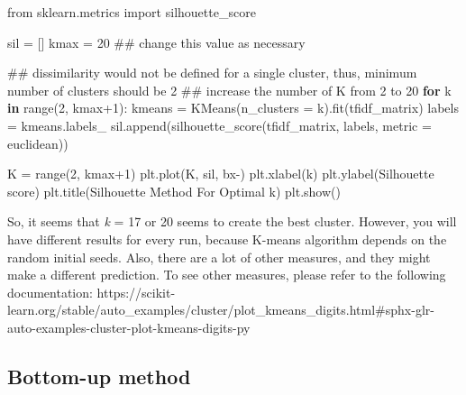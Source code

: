 \documentclass[
  letterpaper,
]{scrbook}
\newenvironment{Shaded}{\begin{snugshade}}{\end{snugshade}}
\newcommand{\BuiltInTok}[1]{\textcolor[rgb]{0.00,0.23,0.31}{#1}}
\newcommand{\CommentTok}[1]{\textcolor[rgb]{0.37,0.37,0.37}{#1}}
\newcommand{\ControlFlowTok}[1]{\textcolor[rgb]{0.00,0.23,0.31}{\textbf{#1}}}
\newcommand{\DecValTok}[1]{\textcolor[rgb]{0.68,0.00,0.00}{#1}}
\newcommand{\ImportTok}[1]{\textcolor[rgb]{0.00,0.46,0.62}{#1}}
\newcommand{\KeywordTok}[1]{\textcolor[rgb]{0.00,0.23,0.31}{\textbf{#1}}}
\newcommand{\NormalTok}[1]{\textcolor[rgb]{0.00,0.23,0.31}{#1}}
\newcommand{\OperatorTok}[1]{\textcolor[rgb]{0.37,0.37,0.37}{#1}}
\newcommand{\StringTok}[1]{\textcolor[rgb]{0.13,0.47,0.30}{#1}}
\begin{document}
\begin{Shaded}
\begin{Highlighting}[]
\ImportTok{from}\NormalTok{ sklearn.metrics }\ImportTok{import}\NormalTok{ silhouette\_score}

\NormalTok{sil }\OperatorTok{=}\NormalTok{ []}
\NormalTok{kmax }\OperatorTok{=} \DecValTok{20} \CommentTok{\#\# change this value as necessary}

\CommentTok{\#\# dissimilarity would not be defined for a single cluster, thus, minimum number of clusters should be 2}
\CommentTok{\#\# increase the number of K from 2 to 20}
\ControlFlowTok{for}\NormalTok{ k }\KeywordTok{in} \BuiltInTok{range}\NormalTok{(}\DecValTok{2}\NormalTok{, kmax}\OperatorTok{+}\DecValTok{1}\NormalTok{):}
\NormalTok{  kmeans }\OperatorTok{=}\NormalTok{ KMeans(n\_clusters }\OperatorTok{=}\NormalTok{ k).fit(tfidf\_matrix)}
\NormalTok{  labels }\OperatorTok{=}\NormalTok{ kmeans.labels\_}
\NormalTok{  sil.append(silhouette\_score(tfidf\_matrix, labels, metric }\OperatorTok{=} \StringTok{\textquotesingle{}euclidean\textquotesingle{}}\NormalTok{))}
    
\NormalTok{K }\OperatorTok{=} \BuiltInTok{range}\NormalTok{(}\DecValTok{2}\NormalTok{, kmax}\OperatorTok{+}\DecValTok{1}\NormalTok{)}
\NormalTok{plt.plot(K, sil, }\StringTok{\textquotesingle{}bx{-}\textquotesingle{}}\NormalTok{)}
\NormalTok{plt.xlabel(}\StringTok{\textquotesingle{}k\textquotesingle{}}\NormalTok{)}
\NormalTok{plt.ylabel(}\StringTok{\textquotesingle{}Silhouette score\textquotesingle{}}\NormalTok{)}
\NormalTok{plt.title(}\StringTok{\textquotesingle{}Silhouette Method For Optimal k\textquotesingle{}}\NormalTok{)}
\NormalTok{plt.show()}
\end{Highlighting}
\end{Shaded}

So, it seems that \emph{k} = 17 or 20 seems to create the best cluster.
However, you will have different results for every run, because K-means
algorithm depends on the random initial seeds. Also, there are a lot of
other measures, and they might make a different prediction. To see other
measures, please refer to the following documentation:
https://scikit-learn.org/stable/auto\_examples/cluster/plot\_kmeans\_digits.html\#sphx-glr-auto-examples-cluster-plot-kmeans-digits-py

\subsection*{Bottom-up method}\label{bottom-up-method}
\end{document}
